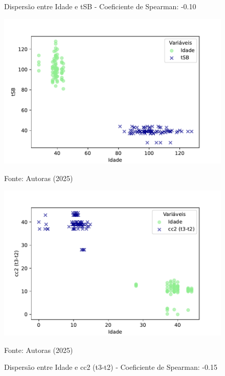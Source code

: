 \begin{figure}[h]
    \captionsetup{font=footnotesize, justification=centering, labelsep=period, position=above}
    \centering
    \begin{minipage}[b]{0.45\linewidth}
        \caption{Dispersão entre Idade e tSB - Coeficiente de Spearman: -0.10}
        \label{fig:idade-tSB}
        \centering
        \includegraphics[scale=0.47]{figuras/Spearman/idade-tSB.pdf}
        \vspace{0.3cm}
        \begin{minipage}{\linewidth}
            \centering
            \scriptsize{Fonte: Autoras (2025)}
        \end{minipage}
    \end{minipage}
    \hspace{0.05\linewidth}
    \begin{minipage}[b]{0.45\linewidth}
        \caption{Dispersão entre Idade e cc2 (t3-t2) - Coeficiente de Spearman: -0.15}
        \label{fig:idade-cc2}
        \centering
        \includegraphics[scale=0.35]{figuras/Spearman/idade-cc2.pdf}
        \vspace{0.3cm}
        \begin{minipage}{\linewidth}
            \centering
            \scriptsize{Fonte: Autoras (2025)}
        \end{minipage}
    \end{minipage}
\end{figure}
\FloatBarrier

